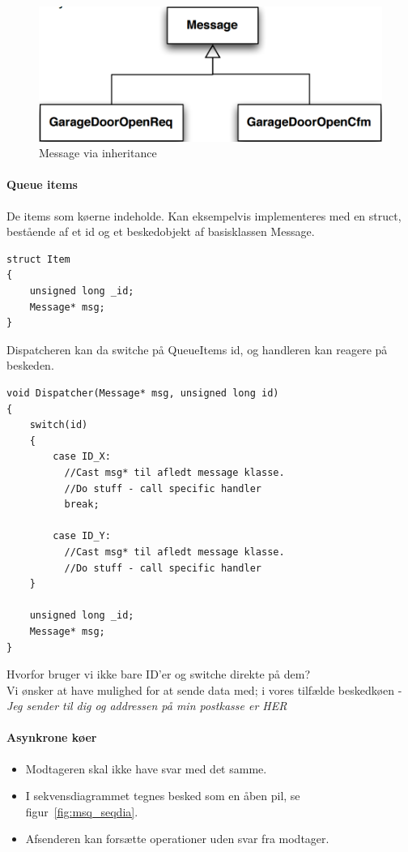 \begin{figure}
\centering
\includegraphics[width=0.7\linewidth]{figs/spm3/message}
\caption{Message via inheritance}
\label{fig:message}
\end{figure}

\paragraph{Queue items}
De items som køerne indeholde. Kan eksempelvis implementeres med en struct, bestående af et id og et beskedobjekt af basisklassen Message.\\

\begin{lstlisting}[caption=Struct qItem]
struct Item
{
	unsigned long _id;
	Message* msg;
}
\end{lstlisting}

Dispatcheren kan da switche på QueueItems id, og handleren kan  reagere på beskeden.

\begin{lstlisting}[caption=Dispatcher]
void Dispatcher(Message* msg, unsigned long id)
{
	switch(id)
	{
		case ID_X:
		  //Cast msg* til afledt message klasse.
		  //Do stuff - call specific handler
		  break;
		
		case ID_Y:
		  //Cast msg* til afledt message klasse.
		  //Do stuff - call specific handler
	}
	
	unsigned long _id;
	Message* msg;
}
\end{lstlisting}

Hvorfor bruger vi ikke bare ID'er og switche direkte på dem?\\

Vi ønsker at have mulighed for at sende data med; i vores tilfælde beskedkøen - \textit{Jeg sender til dig og addressen på min postkasse er HER}

\paragraph{Asynkrone køer}
\begin{itemize}
	\item Modtageren skal ikke have svar med det samme.
	\item I sekvensdiagrammet tegnes besked som en åben pil, se figur~\ref{fig:msq_seqdia}.
	\item Afsenderen kan forsætte operationer uden svar fra modtager.
\end{itemize}

